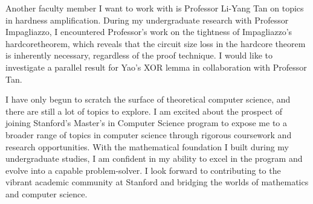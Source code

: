 \documentclass[12pt]{article}
\begin{document}
Another faculty member I want to work with is Professor Li-Yang Tan on topics in hardness
amplification. During my undergraduate research with Professor Impagliazzo, I encountered
Professor's work on the tightness of Impagliazzo's
hardcoretheorem\cite{blanc2024samplecomplexitysmoothboosting}, which reveals that the circuit size
loss in the hardcore theorem is inherently necessary, regardless of the proof technique. I would
like to investigate a parallel result for Yao's XOR lemma in collaboration with Professor Tan.

I have only begun to scratch the surface of theoretical computer science, and there are still a lot
of topics to explore. I am excited about the prospect of joining Stanford's Master's in Computer
Science program to expose me to a broader range of topics in computer science through rigorous
coursework and research opportunities. With the mathematical foundation I built during my
undergraduate studies, I am confident in my ability to excel in the program and evolve into a
capable problem-solver. I look forward to contributing to the vibrant academic community at Stanford
and bridging the worlds of mathematics and computer science.

\newpage



\end{document}

